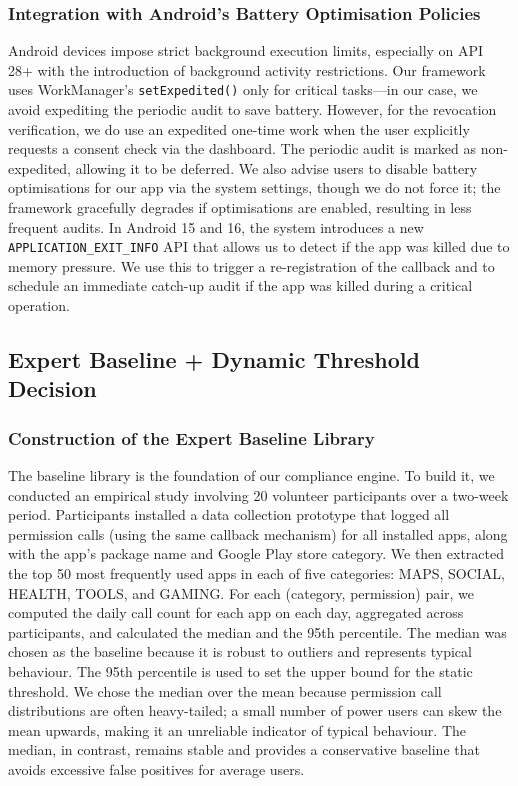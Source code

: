 \subsubsection{Integration with Android's Battery Optimisation Policies}

Android devices impose strict background execution limits, especially on API 28+ with the introduction of background activity restrictions. Our framework uses WorkManager's \texttt{setExpedited()} only for critical tasks—in our case, we avoid expediting the periodic audit to save battery. However, for the revocation verification, we do use an expedited one-time work when the user explicitly requests a consent check via the dashboard. The periodic audit is marked as non-expedited, allowing it to be deferred. We also advise users to disable battery optimisations for our app via the system settings, though we do not force it; the framework gracefully degrades if optimisations are enabled, resulting in less frequent audits. In Android 15 and 16, the system introduces a new \texttt{APPLICATION\_EXIT\_INFO} API that allows us to detect if the app was killed due to memory pressure. We use this to trigger a re-registration of the callback and to schedule an immediate catch-up audit if the app was killed during a critical operation.

\subsection{Expert Baseline + Dynamic Threshold Decision}

\subsubsection{Construction of the Expert Baseline Library}

The baseline library is the foundation of our compliance engine. To build it, we conducted an empirical study involving 20 volunteer participants over a two-week period. Participants installed a data collection prototype that logged all permission calls (using the same callback mechanism) for all installed apps, along with the app's package name and Google Play store category. We then extracted the top 50 most frequently used apps in each of five categories: MAPS, SOCIAL, HEALTH, TOOLS, and GAMING. For each (category, permission) pair, we computed the daily call count for each app on each day, aggregated across participants, and calculated the median and the 95th percentile. The median was chosen as the baseline because it is robust to outliers and represents typical behaviour. The 95th percentile is used to set the upper bound for the static threshold. We chose the median over the mean because permission call distributions are often heavy-tailed; a small number of power users can skew the mean upwards, making it an unreliable indicator of typical behaviour. The median, in contrast, remains stable and provides a conservative baseline that avoids excessive false positives for average users.

